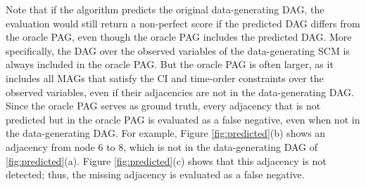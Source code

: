 \documentclass[conference]{IEEEtran}
\begin{document}
Note that if the algorithm predicts the original data-generating DAG, the evaluation would still return a non-perfect score if the predicted DAG differs from the oracle PAG, even though the oracle PAG includes the predicted DAG. More specifically, the DAG over the observed variables of the data-generating SCM is always included in the oracle PAG. But the oracle PAG is often larger, as it includes all MAGs that satisfy the CI and time-order constraints over the observed variables, even if their adjacencies are not in the data-generating DAG. Since the oracle PAG serves as ground truth, every adjacency that is not predicted but in the oracle PAG is evaluated as a false negative, even when not in the data-generating DAG.
For example, Figure \ref{fig:predicted}(b) shows an adjacency from node 6 to 8, which is not in the data-generating DAG of \ref{fig:predicted}(a). Figure \ref{fig:predicted}(c) shows that this adjacency is not detected; thus, the missing adjacency is evaluated as a false negative.
\end{document}
